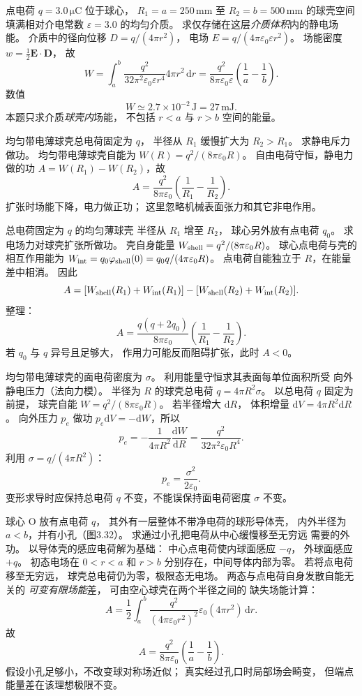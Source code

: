 点电荷 $q=3.0\,\mathrm{\mu C}$
位于球心，
$R_1=a=250\,\mathrm{mm}$ 至
$R_2=b=500\,\mathrm{mm}$ 的球壳空间
填满相对介电常数 $\varepsilon=3.0$
的均匀介质。
求仅存储在这层\emph{介质体积}内的静电场能。
\exsolution
介质中的径向位移
$D=q/(4\pi r^2)$，
电场
$E=q/(4\pi\varepsilon_0\varepsilon r^2)$。
场能密度
$w=\frac12\bm E\cdot\bm D$，
故
\[
W=\int_a^b \frac{q^2}
{32\pi^2\varepsilon_0\varepsilon r^4}
4\pi r^2\,\mathrm dr
=\frac{q^2}{8\pi\varepsilon_0\varepsilon}
\left(\frac1a-\frac1b\right).
\]
数值
\[
\boxed{W\simeq2.7\times10^{-2}\,\mathrm J
=27\,\mathrm{mJ}}.
\]
\excheck 本题只求介质\emph{球壳内}场能，
不包括 $r<a$ 与 $r>b$ 空间的能量。

均匀带电薄球壳总电荷固定为 $q$，
半径从 $R_1$ 缓慢扩大为 $R_2>R_1$。
求静电斥力做功。
\exsolution
均匀带电薄球壳自能为
$W(R)=q^2/(8\pi\varepsilon_0R)$。
自由电荷守恒，静电力做的功
$A=W(R_1)-W(R_2)$，故
\[
\boxed{A=\frac{q^2}{8\pi\varepsilon_0}
\left(\frac1{R_1}-\frac1{R_2}\right)}.
\]
\excheck 扩张时场能下降，电力做正功；
这里忽略机械表面张力和其它非电作用。

总电荷固定为 $q$ 的均匀薄球壳
半径从 $R_1$ 增至 $R_2$，
球心另外放有点电荷 $q_0$。
求电场力对球壳扩张所做功。
\exsolution
壳自身能量
$W_{\rm shell}=q^2/(8\pi\varepsilon_0R)$。
球心点电荷与壳的相互作用能为
$W_{\rm int}=q_0\varphi_{\rm shell}(0)
=q_0q/(4\pi\varepsilon_0R)$。
点电荷自能独立于 $R$，在能量差中相消。
因此
\[
A=[W_{\rm shell}(R_1)+W_{\rm int}(R_1)]
-[W_{\rm shell}(R_2)+W_{\rm int}(R_2)].
\]
整理：
\[
\boxed{A=
\frac{q(q+2q_0)}{8\pi\varepsilon_0}
\left(\frac1{R_1}-\frac1{R_2}\right)}.
\]
\excheck 若 $q_0$ 与 $q$ 异号且足够大，
作用力可能反而阻碍扩张，此时 $A<0$。

均匀带电薄球壳的面电荷密度为 $\sigma$。
利用能量守恒求其表面每单位面积所受
向外静电压力（法向力模）。
\exsolution
半径为 $R$ 的球壳总电荷
$q=4\pi R^2\sigma$。
以总电荷 $q$ 固定为前提，
球壳自能
$W=q^2/(8\pi\varepsilon_0R)$。
若半径增大 $\mathrm dR$，
体积增量
$\mathrm dV=4\pi R^2\mathrm dR$。
向外压力 $p_e$ 做功
$p_e\mathrm dV=-\mathrm dW$，所以
\[
p_e=-\frac1{4\pi R^2}\frac{\mathrm dW}{\mathrm dR}
=\frac{q^2}{32\pi^2\varepsilon_0R^4}.
\]
利用
$\sigma=q/(4\pi R^2)$：
\[
\boxed{p_e=\frac{\sigma^2}{2\varepsilon_0}}.
\]
\excheck 变形求导时应保持总电荷 $q$
不变，不能误保持面电荷密度 $\sigma$ 不变。

球心 O 放有点电荷 $q$，
其外有一层整体不带净电荷的球形导体壳，
内外半径为 $a<b$，并有小孔（图3.32）。
求通过小孔把电荷从中心缓慢移至无穷远
需要的外功。
\exsolution
以导体壳的感应电荷解为基础：
中心点电荷使内球面感应 $-q$，
外球面感应 $+q$。
初态电场在 $0<r<a$ 和 $r>b$
分别存在，中间导体内部为零。
若将点电荷移至无穷远，
球壳总电荷仍为零，极限态无电场。
两态与点电荷自身发散自能无关的
\emph{可变有限场能}差，
可由空心球壳在两个半径之间的
缺失场能计算：
\[
A=\frac12\int_a^b
\frac{q^2}{(4\pi\varepsilon_0r^2)^2}
\varepsilon_0(4\pi r^2)\,\mathrm dr.
\]
故
\[
\boxed{A=\frac{q^2}{8\pi\varepsilon_0}
\left(\frac1a-\frac1b\right)}.
\]
\excheck 假设小孔足够小，不改变球对称场近似；
真实经过孔口时局部场会畸变，
但端点能量差在该理想极限不变。


